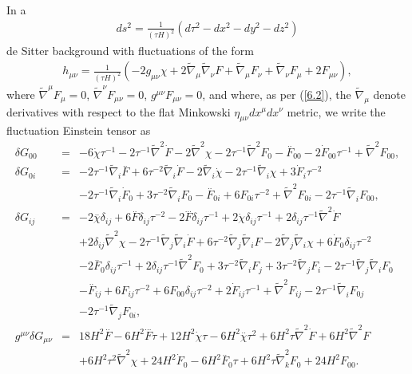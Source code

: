 In a 
%
\begin{align}
ds^2=\frac{1}{(\tau H)^2}(d\tau^2-dx^2-dy^2-dz^2)
\label{6.50}
\end{align}
%
de Sitter background with fluctuations of the form 
%
\begin{align}
h_{\mu\nu}=\frac{1}{(\tau H)^2}(-2g_{\mu\nu}\chi+2\tilde{\nabla}_{\mu}\tilde{\nabla}_{\nu}F
+ \tilde{\nabla}_{\mu}F_{\nu}+\tilde{\nabla}_{\nu}F_{\mu}+2F_{\mu\nu}), 
\label{6.51}
\end{align}
%
where $\tilde{\nabla}^{\mu}F_{\mu}=0$, $\tilde{\nabla}^{\nu}F_{\mu\nu}=0$, $g^{\mu\nu}F_{\mu\nu}=0$, and where, as per (\ref{6.2}), the $\tilde{\nabla}_{\mu}$ denote derivatives with respect to the flat Minkowski $\eta_{\mu\nu}dx^{\mu}dx^{\nu}$ metric, we write the fluctuation Einstein tensor as 
%
\begin{eqnarray}
\delta G_{00}&=& -6 \dot{\chi} \tau^{-1} - 2 \tau^{-1} \tilde{\nabla}^2\dot{F} - 2 \tilde{\nabla}^2\chi -2 \tau^{-1} \tilde{\nabla}^2F_{0}- \overset{..}{F}_{00} - 2 \dot{F}_{00} \tau^{-1} + \tilde{\nabla}^2F_{00},
\nonumber\\ 
\delta G_{0i}&=& -2 \tau^{-1} \tilde{\nabla}_{i}\overset{..}{F} + 6 \tau^{-2} \tilde{\nabla}_{i}\dot{F} - 2 \tilde{\nabla}_{i}\dot{\chi} - 2 \tau^{-1} \tilde{\nabla}_{i}\chi +3 \dot{F}_{i} \tau^{-2} 
\nonumber\\
&&- 2 \tau^{-1} \tilde{\nabla}_{i}\dot{F}_{0} + 3 \tau^{-2} \tilde{\nabla}_{i}F_{0}- \overset{..}{F}_{0i}
 + 6 F_{0i} \tau^{-2} +  \tilde{\nabla}^2F_{0i} - 2 \tau^{-1} \tilde{\nabla}_{i}F_{00},
\nonumber\\ 
\delta G_{ij}&=& -2 \overset{..}{\chi}\delta_{ij} + 6 \overset{..}{F}\delta_{ij} \tau^{-2} - 2 \overset{...}{F}\delta_{ij} \tau^{-1} + 2 \dot{\chi}\delta_{ij} \tau^{-1} + 2\delta_{ij} \tau^{-1} \tilde{\nabla}^2\dot{F} 
\nonumber\\
&&+ 2\delta_{ij} \tilde{\nabla}^2\chi - 2 \tau^{-1} \tilde{\nabla}_{j}\tilde{\nabla}_{i}\dot{F}
 + 6 \tau^{-2} \tilde{\nabla}_{j}\tilde{\nabla}_{i}F - 2 \tilde{\nabla}_{j}\tilde{\nabla}_{i}\chi +6 \dot{F}_{0}\delta_{ij} \tau^{-2} 
 \nonumber\\
 &&- 2 \overset{..}{F}_{0}\delta_{ij} \tau^{-1} + 2\delta_{ij} \tau^{-1} \tilde{\nabla}^2F_{0} + 3 \tau^{-2} \tilde{\nabla}_{i}F_{j} 
 + 3 \tau^{-2} \tilde{\nabla}_{j}F_{i} - 2 \tau^{-1} \tilde{\nabla}_{j}\tilde{\nabla}_{i}F_{0}
 \nonumber\\
 &&- \overset{..}{F}_{ij} + 6 F_{ij} \tau^{-2} + 6 F_{00}\delta_{ij} \tau^{-2} +2 \dot{F}_{ij} \tau^{-1} +\tilde{\nabla}^2F_{ij}
- 2 \tau^{-1} \tilde{\nabla}_{i}F_{0j} 
\nonumber\\
&&- 2 \tau^{-1} \tilde{\nabla}_{j}F_{0i},
\nonumber\\
g^{\mu\nu}\delta G_{\mu\nu} &=& 18 H^2 \overset{..}{F} - 6 H^2 \overset{...}{F} \tau + 12 H^2 \dot{\chi} \tau - 6 H^2 \overset{..}{\chi} \tau^2 + 6 H^2 \tau \tilde{\nabla}^2\dot{F} + 6 H^2 \tilde{\nabla}^2F 
\nonumber \\ 
&& + 6 H^2 \tau^2 \tilde{\nabla}^2\chi +24 H^2 \dot{F}_{0} - 6 H^2 \overset{..}{F}_{0} \tau + 6 H^2 \tau \tilde{\nabla}_{k}^2F_{0}+24 H^2 F_{00}.
\label{6.52}
\end{eqnarray}
